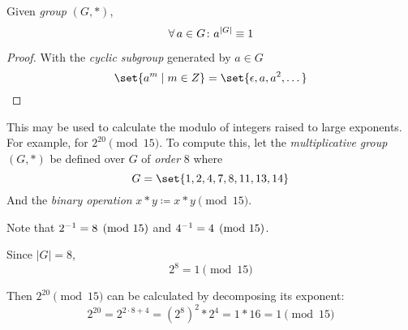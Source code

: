 \begin{proposition}
    Given \textit{group} $(G, \ast)$,
    \begin{equation}
        \operatorname{\forall} a \in G \colon a^{\lvert G \rvert} \equiv 1
    \end{equation}
\end{proposition}

\begin{proof}
    With the \textit{cyclic subgroup} generated by $a \in G$
    \begin{equation}
        \set{a^m \mid m \in \Int} = \set{\epsilon, a, a^2, \dots}
    \end{equation}
\end{proof}

\begin{remark}
    This may be used to calculate the modulo of integers raised to large exponents. For example, for $2^{20} \pmod{15}$. To compute this, let the \textit{multiplicative group} $(G, \ast)$ be defined over $G$ of \textit{order} $8$ where
    \begin{equation}
        G = \set{1, 2, 4, 7, 8, 11, 13, 14}
    \end{equation}
    And the \textit{binary operation} $x \ast y \coloneqq x \ast y \pmod{15}$.
    
    Note that ${2}^{-1} = 8 \pmod{15}$ and ${4}^{-1} = 4 \pmod{15}$.
    
    Since $\lvert G \rvert = 8$,
    \begin{equation}
        2^8 = 1 \pmod{15}
    \end{equation}
    
    Then $2^{20} \pmod 15$ can be calculated by decomposing its exponent:
    \begin{equation}
        2^{20} = 2^{2 \cdot 8 + 4} = (2^8)^2 \ast 2^4 = 1 \ast 16 = 1 \pmod{15}
    \end{equation}
\end{remark}
